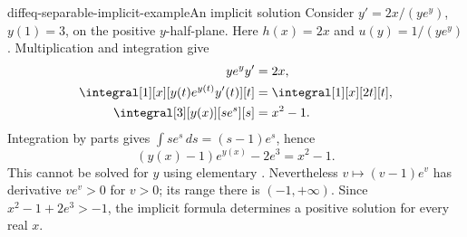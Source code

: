 \documentclass[preview]{standalone}
\begin{document}
\begin{snippetexample}{diffeq-separable-implicit-example}{An implicit solution}
    Consider \(y'=2x/(ye^y)\), \(y(1)=3\), on the positive \(y\)-half-plane.
    Here \(h(x)=2x\) and \(u(y)=1/(ye^y)\). Multiplication and integration give
    \begin{align*}
        ye^y y'&=2x,\\
        \integral[1][x][y(t)e^{y(t)}y'(t)][t]
        &=\integral[1][x][2t][t],\\
        \integral[3][y(x)][se^s][s]&=x^2-1.
    \end{align*}
    Integration by parts gives \(\int se^s\,ds=(s-1)e^s\), hence
    \[
        (y(x)-1)e^{y(x)}-2e^3=x^2-1.
    \]
    This cannot be solved for \(y\) using elementary \function[functions].
    Nevertheless \(v\mapsto(v-1)e^v\) has derivative \(ve^v>0\) for \(v>0\);
    its range there is \((-1,+\infty)\). Since \(x^2-1+2e^3>-1\),
    the implicit formula determines a positive solution for every real \(x\).
\end{snippetexample}
\end{document}
